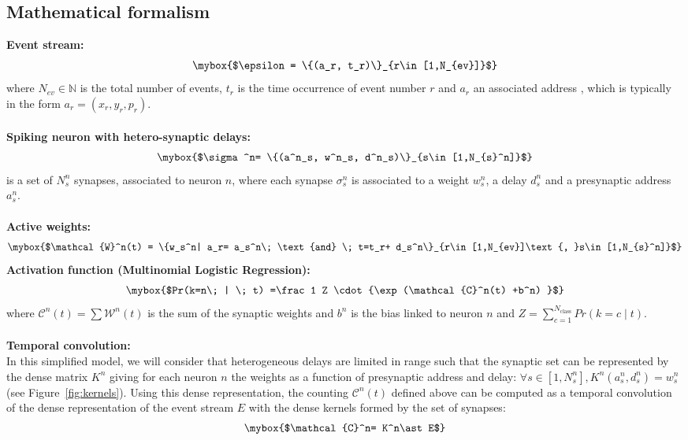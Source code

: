 \documentclass[landscape,a0]{a0poster}
\newcommand{\presynaddr}{a} %
\newcommand{\postsynaddr}{n} %
\newcommand{\numevent}{N_{ev}} %
\newcommand{\arank}{r} %
\newcommand{\bias}{b} %
\newcommand{\synapse}{\sigma} %
\newcommand{\synapticweight}{w} %
\newcommand{\synapticdelay}{d} %
\newcommand{\ranksyn}{s} %
\newcommand{\Nsyn}{N_{s}} %
\newcommand{\activeweights}{\mathcal{W}}
\newcommand{\timev}{t} %
\newcommand{\polev}{p} %
\newcommand{\event}{\epsilon} %
\newcommand{\Nclass}{N_\text{class}} %
\newcommand{\kernel}{K} %
\newcommand{\colorsubsec}{gray}
\begin{document}
\begin{multicols}{3}
\subsection*{\color{\colorsubsec}Mathematical formalism}
%
\textbf{Event stream:}
$$
\mybox{$\event = \{(\presynaddr_\arank, \timev_\arank)\}_{\arank \in [1,\numevent]}$}
$$
where $\numevent \in \mathbb{N} $ is the total number of events, $\timev_\arank$ is the time occurrence of event number $\arank$ and $\presynaddr_\arank$ an associated address , which is typically in the form $\presynaddr_\arank=(x_\arank, y_\arank, \polev_\arank)$. \\
%
\\
\textbf{Spiking neuron with hetero-synaptic delays:}
%
$$
\mybox{$\synapse^\postsynaddr = \{(\presynaddr^\postsynaddr_\ranksyn, \synapticweight^\postsynaddr_\ranksyn, \synapticdelay^\postsynaddr_\ranksyn)\}_{\ranksyn \in [1,\Nsyn^\postsynaddr]}$}
$$
is a set of $\Nsyn^\postsynaddr$ synapses, associated to neuron $\postsynaddr$, where each synapse $\synapse^\postsynaddr_\ranksyn$ is associated to a weight $\synapticweight^\postsynaddr_\ranksyn$, a delay $\synapticdelay^\postsynaddr_\ranksyn$ and a presynaptic address $\presynaddr^\postsynaddr_\ranksyn$.\\
%
\\
\textbf{Active weights:}
%
$$
\mybox{$\activeweights^\postsynaddr(t) = \{\synapticweight_\ranksyn^\postsynaddr | \presynaddr_\arank = \presynaddr_\ranksyn^\postsynaddr \; \text{and} \; \timev=\timev_\arank + \synapticdelay_\ranksyn^\postsynaddr\}_{\arank \in [1,\numevent]\text{, }\ranksyn \in [1,\Nsyn^\postsynaddr]}$}
$$
%
\textbf{Activation function (Multinomial Logistic Regression):}
%
$$
\mybox{$Pr(k=\postsynaddr \; | \; \timev) =\frac 1 Z \cdot {\exp  (\mathcal{C}^\postsynaddr(\timev) +\bias^\postsynaddr) }$}
$$
where $\mathcal{C}^\postsynaddr(\timev) = \sum \activeweights^\postsynaddr(t)
$ is the sum of the synaptic weights and $\bias^\postsynaddr$ is the bias linked to neuron $\postsynaddr$ and $Z= \sum_{c=1}^{\Nclass} Pr(k=c \; | \; \timev)$.\\
%
\\
\textbf{Temporal convolution:}\\
In this simplified model, we will consider that heterogeneous delays are limited in range such that the synaptic set can be represented by the dense matrix $\kernel^\postsynaddr$ giving for each neuron $\postsynaddr$ the weights as a function of presynaptic address and delay: $\forall {\ranksyn \in [1,\Nsyn^\postsynaddr]}, \kernel^\postsynaddr(\presynaddr_\ranksyn^\postsynaddr, \synapticdelay_\ranksyn^\postsynaddr) = \synapticweight_\ranksyn^\postsynaddr$ (see Figure~\ref{fig:kernels}). Using this dense representation, the counting $\mathcal{C}^\postsynaddr(\timev)$ defined above can be computed as a temporal convolution of the dense representation of the event stream $E$ with the dense kernels formed by the set of synapses:
$$
\mybox{$\mathcal{C}^\postsynaddr = \kernel^\postsynaddr \ast E$}
$$

\end{multicols}
\end{document}
